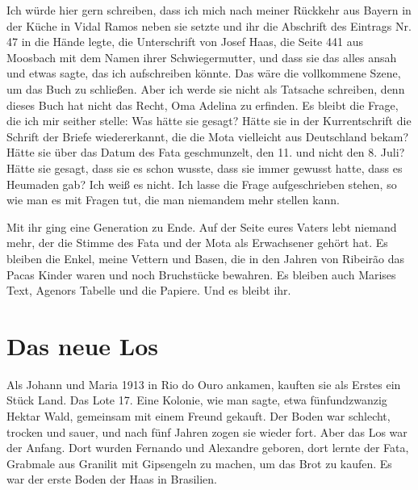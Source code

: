 \documentclass[
  ngerman,
  11pt,
  openany]{book}
\begin{document}
Ich würde hier gern schreiben, dass ich mich nach meiner Rückkehr aus
Bayern in der Küche in Vidal Ramos neben sie setzte und ihr die
Abschrift des Eintrags Nr. 47 in die Hände legte, die Unterschrift von
Josef Haas, die Seite 441 aus Moosbach mit dem Namen ihrer
Schwiegermutter, und dass sie das alles ansah und etwas sagte, das ich
aufschreiben könnte. Das wäre die vollkommene Szene, um das Buch zu
schließen. Aber ich werde sie nicht als Tatsache schreiben, denn dieses
Buch hat nicht das Recht, Oma Adelina zu erfinden. Es bleibt die Frage,
die ich mir seither stelle: Was hätte sie gesagt? Hätte sie in der
Kurrentschrift die Schrift der Briefe wiedererkannt, die die Mota
vielleicht aus Deutschland bekam? Hätte sie über das Datum des Fata
geschmunzelt, den 11. und nicht den 8. Juli? Hätte sie gesagt, dass sie
es schon wusste, dass sie immer gewusst hatte, dass es Heumaden gab? Ich
weiß es nicht. Ich lasse die Frage aufgeschrieben stehen, so wie man es
mit Fragen tut, die man niemandem mehr stellen kann.

Mit ihr ging eine Generation zu Ende. Auf der Seite eures Vaters lebt
niemand mehr, der die Stimme des Fata und der Mota als Erwachsener
gehört hat. Es bleiben die Enkel, meine Vettern und Basen, die in den
Jahren von Ribeirão das Pacas Kinder waren und noch Bruchstücke
bewahren. Es bleiben auch Marises Text, Agenors Tabelle und die Papiere.
Und es bleibt ihr.

\section{Das neue Los}\label{das-neue-los}

Als Johann und Maria 1913 in Rio do Ouro ankamen, kauften sie als Erstes
ein Stück Land. Das Lote 17. Eine Kolonie, wie man sagte, etwa
fünfundzwanzig Hektar Wald, gemeinsam mit einem Freund gekauft. Der
Boden war schlecht, trocken und sauer, und nach fünf Jahren zogen sie
wieder fort. Aber das Los war der Anfang. Dort wurden Fernando und
Alexandre geboren, dort lernte der Fata, Grabmale aus Granilit mit
Gipsengeln zu machen, um das Brot zu kaufen. Es war der erste Boden der
Haas in Brasilien.
\end{document}
